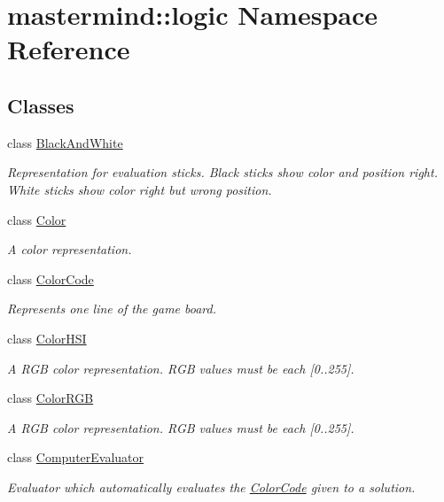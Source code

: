 \hypertarget{namespacemastermind_1_1logic}{}\section{mastermind\+:\+:logic Namespace Reference}
\label{namespacemastermind_1_1logic}
\subsection*{Classes}
\begin{DoxyCompactItemize}
\item 
class \hyperlink{classmastermind_1_1logic_1_1_black_and_white}{Black\+And\+White}
\begin{DoxyCompactList}\small\item\em Representation for evaluation sticks. Black sticks show color and position right. White sticks show color right but wrong position. \end{DoxyCompactList}\item 
class \hyperlink{classmastermind_1_1logic_1_1_color}{Color}
\begin{DoxyCompactList}\small\item\em A color representation. \end{DoxyCompactList}\item 
class \hyperlink{classmastermind_1_1logic_1_1_color_code}{Color\+Code}
\begin{DoxyCompactList}\small\item\em Represents one line of the game board. \end{DoxyCompactList}\item 
class \hyperlink{classmastermind_1_1logic_1_1_color_h_s_i}{Color\+H\+SI}
\begin{DoxyCompactList}\small\item\em A R\+GB color representation. R\+GB values must be each \mbox{[}0..255\mbox{]}. \end{DoxyCompactList}\item 
class \hyperlink{classmastermind_1_1logic_1_1_color_r_g_b}{Color\+R\+GB}
\begin{DoxyCompactList}\small\item\em A R\+GB color representation. R\+GB values must be each \mbox{[}0..255\mbox{]}. \end{DoxyCompactList}\item 
class \hyperlink{classmastermind_1_1logic_1_1_computer_evaluator}{Computer\+Evaluator}
\begin{DoxyCompactList}\small\item\em Evaluator which automatically evaluates the \hyperlink{classmastermind_1_1logic_1_1_color_code}{Color\+Code} given to a solution. \end{DoxyCompactList}\item 

\end{DoxyCompactItemize}
